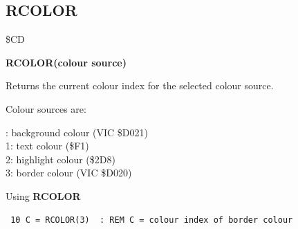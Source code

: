 \subsection{RCOLOR}
\begin{description}[leftmargin=2cm,style=nextline]
\item [Token:] \$CD
\item [Format:] {\bf RCOLOR(colour source)}
\item [Usage:]  Returns the current colour index for the
                selected colour source.

                Colour sources are:

{: background colour (VIC \$D021) \\
                1: text colour (\$F1) \\
                2: highlight colour (\$2D8) \\
                3: border colour (VIC \$D020)
}
\item [Example:] Using {\bf RCOLOR}

\begin{tcolorbox}[colback=black,coltext=white]
\verbatimfont{\codefont}
\begin{verbatim}
 10 C = RCOLOR(3)  : REM C = colour index of border colour
\end{verbatim}
\end{tcolorbox}
\end{description}


\newpage
